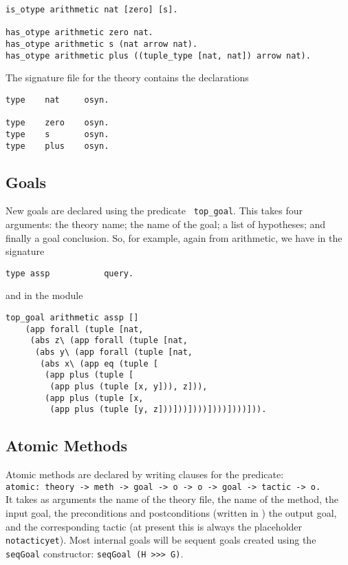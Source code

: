 \begin{verbatim}
is_otype arithmetic nat [zero] [s].

has_otype arithmetic zero nat.
has_otype arithmetic s (nat arrow nat).
has_otype arithmetic plus ((tuple_type [nat, nat]) arrow nat).
\end{verbatim}

The signature file for the theory contains the declarations

\begin{verbatim}
type    nat     osyn.

type    zero    osyn.
type    s       osyn.
type    plus    osyn.
\end{verbatim}


\subsection{Goals}

New goals are declared using the predicate {\tt
  top\_goal}.  This takes four arguments: the theory
name; the name of the goal; a list of hypotheses; and finally a goal
conclusion.  So, for example, again from arithmetic, we have in the signature

\begin{verbatim}
type assp           query.
\end{verbatim}

and in the module

\begin{verbatim}
top_goal arithmetic assp []
    (app forall (tuple [nat, 
     (abs z\ (app forall (tuple [nat, 
      (abs y\ (app forall (tuple [nat, 
       (abs x\ (app eq (tuple [
        (app plus (tuple [
         (app plus (tuple [x, y])), z])), 
        (app plus (tuple [x, 
         (app plus (tuple [y, z]))]))])))])))])))])).
\end{verbatim}

\subsection{Atomic Methods}

Atomic methods are declared by writing clauses
for the predicate: \\
{\tt atomic: theory -> meth -> goal -> o -> o -> goal -> tactic -> o.} \\
It takes as arguments the name of the theory file,
the name of the method, the input
goal, the preconditions and
postconditions (written in \lprolog) the output
goal, and the corresponding tactic
(at present this is always the placeholder {\tt
  notacticyet}).  Most internal goals will be
sequent goals created using the {\tt
  seqGoal} constructor: {\tt seqGoal (H >>> G)}.

